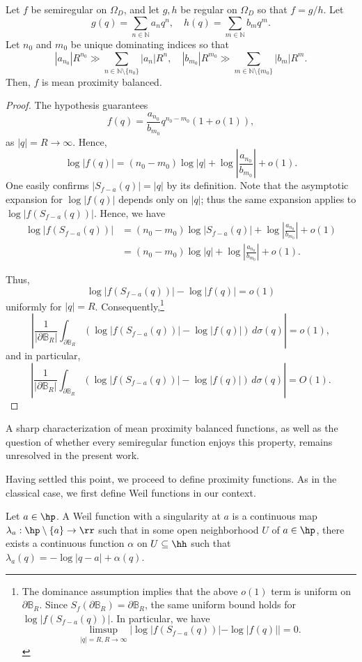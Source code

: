 \documentclass{amsart}
\begin{document}
\begin{prop}
Let $f$ be semiregular on $\Omega_D$, and let $g,h$ be regular on $\Omega_D$ so that $f=g/h$. Let \[ g(q)=\sum_{n\in\mathbb{N}} a_nq^n, \quad h(q)=\sum_{m\in\mathbb N}b_m q^m.\] Let $n_0$ and $m_0$ be unique dominating indices so that \[|a_{n_0}|R^{n_0}\gg\sum_{n\in\mathbb{N}\setminus\{n_0\}} |a_n|R^n, \quad |b_{m_0}|R^{m_0}\gg\sum_{m\in\mathbb{N}\setminus\{m_0\}} |b_m|R^m.\] Then, $f$ is mean proximity balanced.
\end{prop}
\begin{proof}

The hypothesis guarantees \[f(q)=\frac{a_{n_0}}{b_{m_0}}q^{n_0-m_0}(1+o(1)),\] as $|q|=R\to \infty$. Hence, \[\log|f(q)|=(n_0-m_0)\log|q|+\log\left|\frac{a_{n_0}}{b_{m_0}}\right|+o(1).\] One easily confirms $|S_{f-a}(q)|=|q|$ by its definition. Note that the asymptotic expansion for $\log|f(q)|$ depends only on $|q|$; thus the same expansion applies to $\log|f(S_{f-a}(q))|$. Hence, we have \begin{align*}\log|f(S_{f-a}(q))|&=(n_0-m_0)\log|S_{f-a}(q)|+\log\left|\frac{a_{n_0}}{b_{m_0}}\right|+o(1)\\ 
&=(n_0-m_0)\log|q|+\log\left|\frac{a_{n_0}}{b_{m_0}}\right|+o(1).\end{align*} 

Thus, \[\log|f(S_{f-a}(q))|-\log|f(q)|=o(1)\] uniformly for $|q|=R$. Consequently,\footnote{The dominance assumption implies that the above $o(1)$ term is uniform on $\partial \mathbb B_R$. Since $S_f(\partial \mathbb B_R)=\partial \mathbb B_R$, the same uniform bound holds for $\log|f(S_{f-a}(q))|$. In particular, we have \[\limsup_{|q|=R, R\to \infty}|\log|f(S_{f-a}(q))|-\log|f(q)||=0.\]} \[\left|\frac{1}{|\partial \mathbb{B}_R|}\int_{\partial \mathbb{B}_R}\left(\log|f(S_{f-a}(q))|-\log|f(q)|\right)\,d\sigma(q)\right|=o(1),\] and in particular, \[\left|\frac{1}{|\partial \mathbb{B}_R|}\int_{\partial \mathbb{B}_R}\left(\log|f(S_{f-a}(q))|-\log|f(q)|\right)\,d\sigma(q)\right|=O(1).\]

\end{proof}

A sharp characterization of mean proximity balanced functions, as well as the question of whether every semiregular function enjoys this property, remains unresolved in the present work.

Having settled this point, we proceed to define proximity functions. As in the classical case, we first define Weil functions in our context. 

\begin{defin}\label{def:Weil}
    Let $a\in\hp$. A Weil function with a singularity at $a$ is a continuous map $\lambda_a:\hp \setminus\{a\}\to \rr$ such that in some open neighborhood $U$ of $a\in\hp$, there exists a continuous function $\alpha$ on $U\subseteq\hh$ such that $\lambda_a(q)=-\log|q-a|+\alpha(q)$. 
\end{defin}
\end{document}
